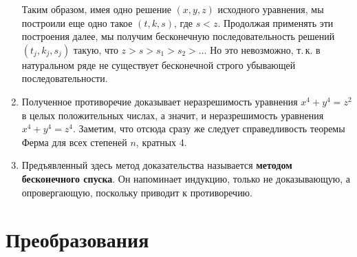 \begin{enumerate}
Таким образом, имея одно решение $(x,y,z)$ исходного уравнения, мы построили еще одно такое $(t,k,s)$, где $s<z$. Продолжая применять эти построения далее, мы получим бесконечную последовательность решений $(t_j,k_j,s_j)$ такую, что $z>s>s_1>s_2>\dots$ Но это невозможно, т.\,к. в натуральном ряде не существует бесконечной строго убывающей последовательности.

\item Полученное противоречие доказывает неразрешимость уравнения $x^4+y^4=z^2$ в целых положительных числах, а значит, и неразрешимость уравнения $x^4+y^4=z^4$. Заметим, что отсюда сразу же следует справедливость теоремы Ферма для всех степеней $n$, кратных 4.

\item Предъявленный здесь метод доказательства называется \textbf{методом бесконечного спуска}. Он напоминает индукцию, только не доказывающую, а опровергающую, поскольку приводит к противоречию.

\end{enumerate}

\label{linalg}


\section{Преобразования}


